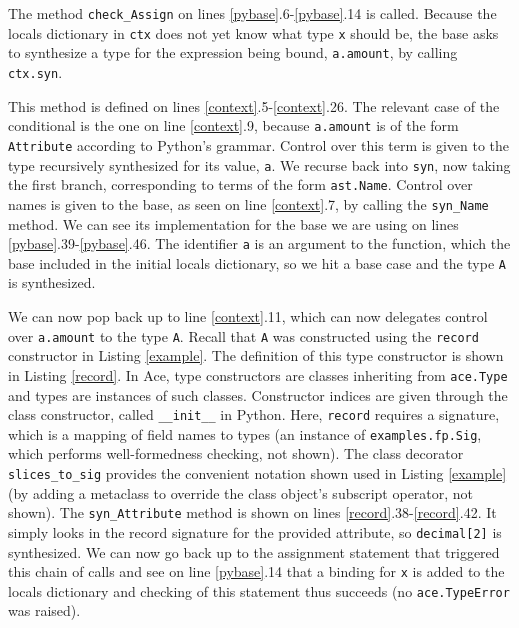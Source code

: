 \documentclass[10pt,preprint]{sigplanconf}
\begin{document}
{The method \verb|check_Assign| on lines \ref{pybase}.6-\ref{pybase}.14 is called. Because the locals dictionary in \verb|ctx| does not yet know what type \verb|x| should be, the base asks to synthesize a type for the expression being bound, \verb|a.amount|, by calling \verb|ctx.syn|.

This method is defined on lines \ref{context}.5-\ref{context}.26. The relevant case of the conditional is the one on line \ref{context}.9, because \verb|a.amount| is of the form \verb|Attribute| according to Python's grammar. Control over this term is given to the type recursively synthesized for its value, \verb|a|. We recurse back into \verb|syn|, now taking the first branch, corresponding to terms of the form \verb|ast.Name|. Control over names is given to the base, as seen on line \ref{context}.7, by calling the \verb|syn_Name| method. We can see its implementation for the base we are using on lines \ref{pybase}.39-\ref{pybase}.46. The identifier \verb|a| is an argument to the function, which the base included in the initial locals dictionary, so we hit a base case and the type \verb|A| is synthesized.

We can now pop back up to line \ref{context}.11, which can now delegates control over \verb|a.amount| to the type \verb|A|. Recall that \verb|A| was constructed using the \verb|record| constructor in Listing \ref{example}. The definition of this type constructor is shown in Listing \ref{record}. In Ace, type constructors are classes inheriting from \verb|ace.Type| and types are instances of such classes. Constructor indices are given through the class constructor, called \verb|__init__| in Python. Here, \verb|record| requires a signature, which is a mapping of field names to types (an instance of \verb|examples.fp.Sig|, which performs well-formedness checking, not shown). The class decorator \verb|slices_to_sig| provides the convenient notation shown used in Listing \ref{example} (by adding a metaclass to override the class object's subscript operator, not shown). The \verb|syn_Attribute| method is shown on lines \ref{record}.38-\ref{record}.42. It simply looks in the record signature for the provided attribute, so \verb|decimal[2]| is synthesized. We can now go back up to the assignment statement that triggered this chain of calls and see on line \ref{pybase}.14 that a binding for \verb|x| is added to the locals dictionary and checking of this statement thus succeeds (no \verb|ace.TypeError| was raised). 

}
\end{document}
